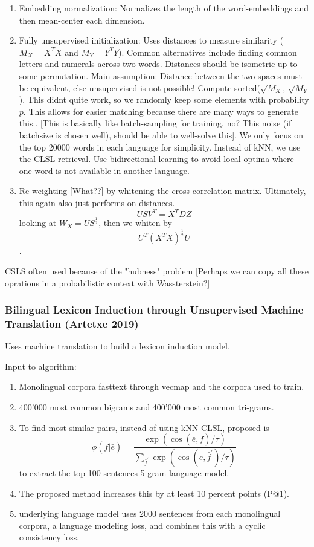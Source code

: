 \documentclass[a4paper,12pt,twoside,openright]{report}
\begin{document}
\begin{enumerate}
\item Embedding normalization: Normalizes the length of the word-embeddings and then mean-center each dimension.
\item Fully unsupervised initialization: Uses distances to measure similarity ($M_X=X^TX$ and $M_Y=Y^TY$). 
Common alternatives include finding common letters and numerals across two words.
Distances should be isometric up to some permutation. Main assumption: Distance between the two spaces must be equivalent, else unsupervised is not possible!
Compute sorted($\sqrt{M_X}$, $\sqrt{M_Y}$ ).
This didnt quite work, so we randomly keep some elements with probability $p$.
This allows for easier matching because there are many ways to generate this..
[This is basically like batch-sampling for training, no? This noise (if batchsize is chosen well), should be able to well-solve this].
We only focus on the top 20000 words in each language for simplicity.
Instead of kNN, we use the CLSL retrieval.
Use bidirectional learning to avoid local optima where one word is not available in another language.
\item Re-weighting [What??] by whitening the cross-correlation matrix. 
Ultimately, this again also just performs on distances.
$$ USV^T =  X^TDZ $$ looking at $ W_X = US^\frac{1}{2} $, then we whiten by $$ U^T (X^T X)^{\frac{1}{2}} U $$. 
\end{enumerate}


CSLS often used because of the "hubness" problem
[Perhaps we can copy all these oprations in a probabilistic context with Wassterstein?]

\subsubsection{Bilingual Lexicon Induction through Unsupervised Machine Translation (Artetxe 2019)}

Uses machine translation to build a lexicon induction model.

Input to algorithm:

\begin{enumerate}
\item Monolingual corpora fasttext through vecmap and the corpora used to train.
\item 400'000 most common bigrams and 400'000 most common tri-grams.
\item To find most similar pairs, instead of using kNN CLSL, proposed is
$$
	\phi(\bar{f} | \bar{e})=\frac{\exp (\cos (\bar{e}, \bar{f}) / \tau)}{\sum_{\bar{f}^{\prime}} \exp \left(\cos \left(\bar{e}, \bar{f}^{\prime}\right) / \tau\right)}
$$
to extract the top 100 sentences
5-gram language model.
\item The proposed method increases this by at least 10 percent points (P@1).
\item underlying language model uses 2000 sentences from each monolingual corpora, a language modeling loss, and combines this with a cyclic consistency loss.
\end{enumerate}
\end{document}
